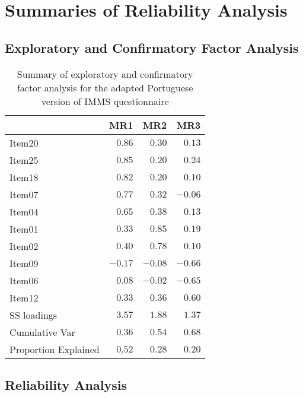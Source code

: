 \section{Summaries of Reliability Analysis}

\subsection{Exploratory and Confirmatory Factor Analysis}

\begin{table}[!htbp]
\caption{Summary of exploratory and confirmatory factor analysis for the adapted Portuguese version of IMMS questionnaire\label{fa}} 
\begin{center}
\begin{tabular}{lrrr}
\hline\hline
\multicolumn{1}{l}{}&\multicolumn{1}{c}{MR1}&\multicolumn{1}{c}{MR2}&\multicolumn{1}{c}{MR3}\tabularnewline
\hline
Item20&$ 0.86$&$ 0.30$&$ 0.13$\tabularnewline
Item25&$ 0.85$&$ 0.20$&$ 0.24$\tabularnewline
Item18&$ 0.82$&$ 0.20$&$ 0.10$\tabularnewline
Item07&$ 0.77$&$ 0.32$&$-0.06$\tabularnewline
Item04&$ 0.65$&$ 0.38$&$ 0.13$\tabularnewline
Item01&$ 0.33$&$ 0.85$&$ 0.19$\tabularnewline
Item02&$ 0.40$&$ 0.78$&$ 0.10$\tabularnewline
Item09&$-0.17$&$-0.08$&$-0.66$\tabularnewline
Item06&$ 0.08$&$-0.02$&$-0.65$\tabularnewline
Item12&$ 0.33$&$ 0.36$&$ 0.60$\tabularnewline
SS loadings&$ 3.57$&$ 1.88$&$ 1.37$\tabularnewline
Cumulative Var&$ 0.36$&$ 0.54$&$ 0.68$\tabularnewline
Proportion Explained&$ 0.52$&$ 0.28$&$ 0.20$\tabularnewline
\hline
\end{tabular}\end{center}

\end{table}

\subsection{Reliability Analysis}

